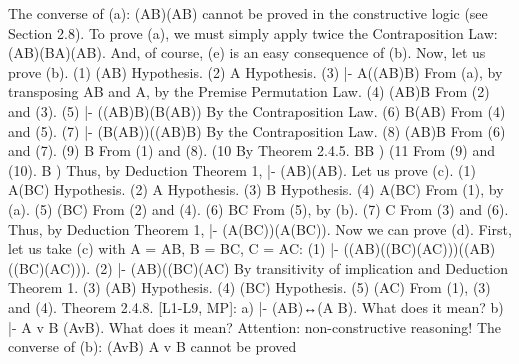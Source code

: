 The converse of (a): (\neg \neg A\IMPLIES \neg \neg B)\IMPLIES (A\IMPLIES B) cannot be proved in the constructive logic (see Section 2.8).
To prove (a), we must simply apply twice the Contraposition Law: (A\IMPLIES B)\IMPLIES (\neg B\IMPLIES \neg A)\IMPLIES (\neg \neg A\IMPLIES \neg \neg B).
And, of course, (e) is an easy consequence of (b).
Now, let us prove (b).
(1) \neg \neg (A\IMPLIES B) Hypothesis.
(2) \neg \neg A Hypothesis.
(3) |- \neg \neg A\IMPLIES ((A\IMPLIES B)\IMPLIES \neg \neg B) From (a), by transposing A\IMPLIES B and
                                  \neg \neg A, by the Premise Permutation Law.
(4) (A\IMPLIES B)\IMPLIES \neg \neg B From (2) and (3).
(5) |- ((A\IMPLIES B)\IMPLIES \neg \neg B)\IMPLIES (\neg \neg \neg B\IMPLIES \neg (A\IMPLIES B)) By the Contraposition Law.
(6) \neg \neg \neg B\IMPLIES \neg (A\IMPLIES B) From (4) and (5).
(7) |- (\neg \neg \neg B\IMPLIES \neg (A\IMPLIES B))\IMPLIES (\neg \neg (A\IMPLIES B)\IMPLIES \neg \neg \neg \neg B) By the Contraposition Law.
(8) \neg \neg (A\IMPLIES B)\IMPLIES \neg \neg \neg \neg B From (6) and (7).
(9) \neg \neg \neg \neg B From (1) and (8).
(10 By Theorem 2.4.5.
\neg \neg \neg \neg B\IMPLIES \neg \neg B 
        ) 
(11 From (9) and (10).
\neg \neg B 
  ) 
Thus, by Deduction Theorem 1, |- \neg \neg (A\IMPLIES B)\IMPLIES (\neg \neg A\IMPLIES \neg \neg B).
Let us prove (c).
(1) A\IMPLIES (B\IMPLIES C) Hypothesis.
(2) \neg \neg A Hypothesis.
(3) \neg \neg B Hypothesis.
(4) \neg \neg A\IMPLIES \neg \neg (B\IMPLIES C) From (1), by (a).
(5) \neg \neg (B\IMPLIES C) From (2) and (4).
(6) \neg \neg B\IMPLIES \neg \neg C From (5), by (b).
(7) \neg \neg C From (3) and (6).
Thus, by Deduction Theorem 1, |- (A\IMPLIES (B\IMPLIES C))\IMPLIES (\neg \neg A\IMPLIES (\neg \neg B\IMPLIES \neg \neg C)).
Now we can prove (d). First, let us take (c) with A = A\IMPLIES B, B = B\IMPLIES C, C = A\IMPLIES C:
(1) |- ((A\IMPLIES B)\IMPLIES ((B\IMPLIES C)\IMPLIES (A\IMPLIES C)))\IMPLIES (\neg \neg (A\IMPLIES B)\IMPLIES (\neg \neg (B\IMPLIES C)\IMPLIES \neg \neg (A\IMPLIES C))).
(2) |- (A\IMPLIES B)\IMPLIES ((B\IMPLIES C)\IMPLIES (A\IMPLIES C) By transitivity of implication and Deduction
                                   Theorem 1.
(3) \neg \neg (A\IMPLIES B) Hypothesis.
(4) \neg \neg (B\IMPLIES C) Hypothesis.
(5) \neg \neg (A\IMPLIES C) From (1), (3) and (4).
Theorem 2.4.8. [L1-L9, MP]: a) |- \neg \neg (A\AND B)↔(\neg \neg A \AND  \neg \neg B). What does it mean?
b) |- \neg \neg A v \neg \neg B \IMPLIES  \neg \neg (AvB). What does it mean?
Attention: non-constructive reasoning! The converse of (b): \neg \neg (AvB) \IMPLIES  \neg \neg A v \neg \neg B cannot be proved
